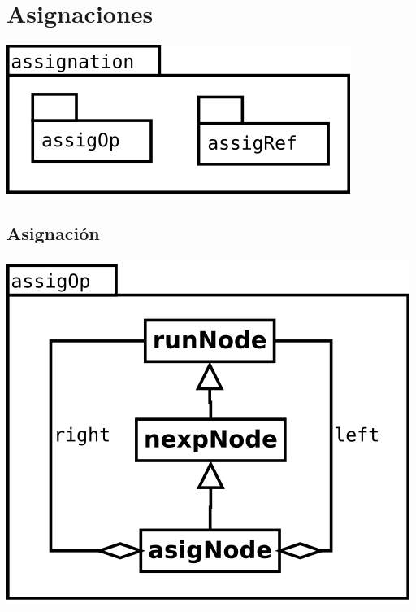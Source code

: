\section {Asignaciones}
\begin{center}
\includegraphics[scale=0.4]{assig-package.png} \\
\end{center}

\subsection {Asignación}
\begin{center}
\includegraphics[scale=0.4]{assigNode.png} \\
\end{center}

